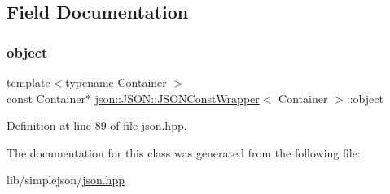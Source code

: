 \subsection{Field Documentation}
\mbox{\label{classjson_1_1_j_s_o_n_1_1_j_s_o_n_const_wrapper_a945ba0baef716a60327d5e4b871f9a42}} 
\subsubsection{\texorpdfstring{object}{object}}
{\footnotesize\ttfamily template$<$typename Container $>$ \\
const Container$\ast$ \mbox{\hyperlink{classjson_1_1_j_s_o_n_1_1_j_s_o_n_const_wrapper}{json\+::\+J\+S\+O\+N\+::\+J\+S\+O\+N\+Const\+Wrapper}}$<$ Container $>$\+::object\hspace{0.3cm}{\ttfamily [private]}}



Definition at line 89 of file json.\+hpp.



The documentation for this class was generated from the following file\+:\begin{DoxyCompactItemize}
\item 
lib/simplejson/\mbox{\hyperlink{lib_2simplejson_2json_8hpp}{json.\+hpp}}\end{DoxyCompactItemize}
